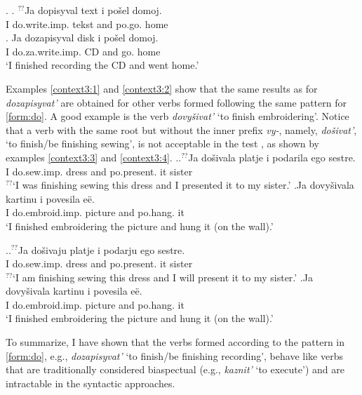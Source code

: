 \ex.\label{context2} \ag. \label{context1:2}$^{??}$Ja dopisyval text i po\v{s}el\textsuperscript{\PF} domoj.\\
{}I do.write.imp. tekst and po.go. home\\
\bg. \label{context2:2}Ja dozapisyval disk i po\v{s}el\textsuperscript{\PF} domoj.\\
I do.za.write.imp. CD and go. home\\
\trans `I finished recording the CD and went home.'

Examples \ref{context3:1} and \ref{context3:2} show that the same results as for \textit{dozapisyvat'} are obtained for other verbs formed following the same pattern for  \ref{form:do}. A good example is the verb \textit{dovy\v{s}ivat'} `to finish embroidering'. Notice that a verb with the same root but without the inner prefix \textit{vy-}, namely, \textit{do\v{s}ivat'}, `to finish/be finishing sewing', is not acceptable in the test , as shown by examples \ref{context3:3} and \ref{context3:4}.
\ex.\label{context3}\ag.\label{context3:3}$^{??}$Ja do\v{s}ivala platje i podarila\textsuperscript{\PF} ego sestre.\\
{}I do.sew.imp. dress and po.present. it sister\\
$^{??}$`I was finishing sewing this dress and I presented it to my sister.'
\bg.\label{context3:1}Ja dovy\v{s}ivala kartinu i povesila\textsuperscript{\PF} e\"e.\\
I do.embroid.imp. picture and po.hang. it\\
\trans `I finished embroidering the picture and hung it (on the wall).'

\ex.\label{context31}\ag.\label{context3:4}$^{??}$Ja do\v{s}ivaju platje i podarju\textsuperscript{\PF} ego sestre.\\
{}I do.sew.imp. dress and po.present. it sister\\
$^{??}$`I am finishing sewing this dress and I will present it to my sister.'
\bg.\label{context3:2}Ja dovy\v{s}ivala kartinu i povesila\textsuperscript{\PF} e\"e.\\
I do.embroid.imp. picture and po.hang. it\\
\trans `I finished embroidering the picture and hung it (on the wall).'

To summarize, I have shown that the verbs formed according to the pattern in \ref{form:do}, e.g., \textit{dozapisyvat'} `to finish/be finishing recording', behave like verbs that are traditionally considered biaspectual (e.g., \textit{kaznit'} `to execute') and are intractable in the syntactic approaches.

